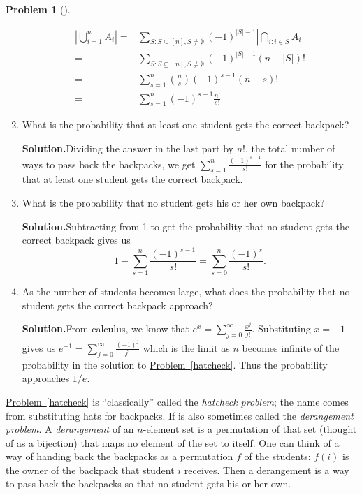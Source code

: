 \documentclass[10pt,]{book}
\theoremstyle{plain}
\theoremstyle{definition}
\newtheorem{activity}[project]{Problem}
\theoremstyle{definition}
\numberwithin{equation}{chapter}
\newcommand{\amp}{&}
\begin{document}
\begin{activity}[]
\begin{enumerate}[font=\bfseries,label=(\alph*),ref=\alph*]
\begin{align*}
\left|\bigcup_{i=1}^n A_i \right|  =\amp  \sum_{S:
S\subseteq [n], S\not=\emptyset}
(-1)^{|S|-1}\left|\bigcap_{i:i\in S} A_i \right|\\
=\amp \sum_{S:
S\subseteq [n], S\not=\emptyset}(-1)^{|S|-1} (n-|S|)!\\
=\amp
\sum_{s=1}^n \binom{n}{s}(-1)^{s-1}(n-s)!\\
=\amp \sum_{s=1}^n
(-1)^{s-1}\frac{n!}{s!}
\end{align*}
%
\item\label{task-166} What is the probability that at least one student gets the correct backpack?%
\par\medskip\noindent%
\textbf{Solution.}\quad Dividing the answer in the last part by \(n!\), the total number of ways to pass back the backpacks, we get \(\sum_{s=1}^n \frac{(-1)^{s-1}}{s!}\) for the probability that at least one student gets the correct backpack.%
\item\label{hatcheckprobpart} What is the probability that no student gets his or her own backpack?%
\par\medskip\noindent%
\textbf{Solution.}\quad Subtracting from 1 to get the probability that no student gets the correct backpack gives us%
\begin{equation*}
1-\sum_{s=1}^n  \frac{(-1)^{s-1}}{s!} = \sum_{s=0}^n \frac{(-1)^s}{s!}.
\end{equation*}
%
\item\label{task-168} As the number of students becomes large, what does the probability that no student gets the correct backpack approach?%
\par\medskip\noindent%
\textbf{Solution.}\quad From calculus, we know that \(e^x=\sum_{j=0}^\infty \frac{x^j}{j!}\). Substituting \(x=-1\) gives us \(e^{-1}=\sum_{j=0}^\infty
\frac{(-1)^j}{j!}\) which is the limit as \(n\) becomes infinite of the probability in the solution to \hyperref[hatcheck]{Problem~\ref{hatcheck}}. Thus the probability approaches \(1/e\).%
\end{enumerate}
\end{activity}
\hyperref[hatcheck]{Problem~\ref{hatcheck}} is ``classically'' called the \emph{hatcheck problem}; the name comes from substituting hats for backpacks. If is also sometimes called the \emph{derangement problem}. A \emph{derangement} of an \(n\)-element set is a permutation of that set (thought of as a bijection) that maps no element of the set to itself. One can think of a way of handing back the backpacks as a permutation \(f\) of the students: \(f(i)\) is the owner of the backpack that student \(i\) receives. Then a derangement is a way to pass back the backpacks so that no student gets his or her own.%
\typeout{************************************************}
\typeout{************************************************}
\end{document}
